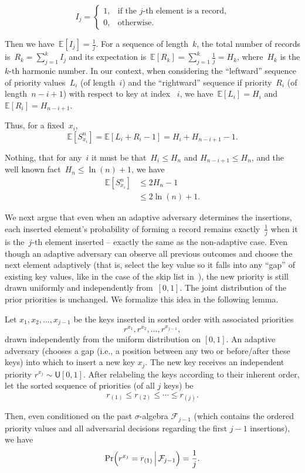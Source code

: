 $$ I_j = 
\begin{cases}
    1, & \text{if the } j\text{-th} \text{ element is a record,}\\
    0, & \text{otherwise.}
\end{cases}
$$

Then we have~$\mathbb{E}[I_j] = \frac{1}{j}$. For a sequence of length~$k$, the total number of records is~$R_k = \sum_{j=1}^{k} I_j$ and its expectation is~$\mathbb{E}[R_k] = \sum_{j=1}^{k} \frac{1}{j} = H_k$, where~$H_k$ is the $k\text{-th}$ harmonic number. In our context, when considering the ``leftward'' sequence of priority values~$L_i$ (of length~$i$) and the ``rightward'' sequence if priority~$R_i$ (of length~$n-i+1$) with respect to key at index ~$i$, we have~$\mathbb{E}[L_i] = H_i$ and~$\mathbb{E}[R_i] = H_{n-i+1}$. 

Thus, for a fixed~$x_i$,
$$\mathbb{E}[S^{n}_{x_i}] = \mathbb{E}[L_i + R_i - 1] = H_i + H_{n-i+1} - 1.$$

Nothing, that for any~$i$ it must be that~$ H_i \leq H_n$ and $H_{n-i+1} \leq H_n$, and the well known fact~$H_n \leq \ln(n) + 1$, we have
\begin{align*}
    \mathbb{E}[S^{n}_{x_i}] &\leq 2H_n - 1 \\
    &\leq 2\ln(n) + 1.
\end{align*}

We next argue that even when an adaptive adversary determines the insertions, each inserted element's probability of forming a record remains exactly~$\frac{1}{j}$ when it is the~$j\text{-th}$ element inserted -- exactly the same as the non-adaptive case. Even though an adaptive adversary can observe all previous outcomes and choose the next element adaptively (that is, select the key value so it falls into any ``gap'' of existing key values, like in the case of the skip list in~), the new priority is still drawn uniformly and independently from~$[0,1]$. The joint distribution of the prior priorities is unchanged. We formalize this idea in the following lemma. 

\begin{lemma}\label{lemma:tre}
Let $x_1, x_2, \ldots, x_{j-1}$ be the keys inserted in sorted order with associated priorities 
$$r^{x_1}, r^{x_2}, \ldots, r^{x_{j-1}},$$
drawn independently from the uniform distribution on $[0,1]$. An adaptive adversary (chooses a gap (i.e., a position between any two or before/after these keys) into which to insert a new key $x_j$. The new key receives an independent priority $r^{x_j} \sim \mathsf{U}[0,1]$. After relabeling the keys according to their inherent order, let the sorted sequence of priorities (of all $j$ keys) be
$$r_{(1)} \le r_{(2)} \le \cdots \le r_{(j)}.$$

Then, even conditioned on the past $\sigma$-algebra $\mathcal{F}_{j-1}$ (which contains the ordered priority values and all adversarial decisions regarding the first $j-1$ insertions), we have
$$\Pr\Bigl(r^{x_j} = r_{(1)} \,\Big|\, \mathcal{F}_{j-1}\Bigr) = \frac{1}{j}.$$

\end{lemma}

